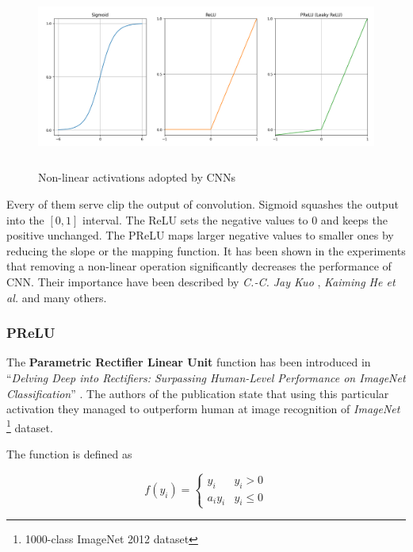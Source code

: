 \begin{figure}[h]
    \centering
    \includegraphics[width=16cm, height=6cm]{img/CNN-activations.png}
    \caption{Non-linear activations adopted by CNNs}
    \label{fig:conv-activation}
\end{figure}

Every of them serve clip the output of convolution. Sigmoid squashes the output into the $[0, 1]$ interval. The ReLU sets the negative values to 0 and keeps the positive unchanged. The PReLU maps larger negative values to smaller ones by reducing the slope or the mapping function. It has been shown in the experiments that removing a non-linear operation significantly decreases the performance of CNN. Their importance have been described by \emph{C.-C. Jay Kuo} \cite{kuo2016understanding}, \emph{Kaiming He et al.} \cite{he2015delving} and many others.


\subsubsection*{PReLU}
\label{sub2:prelu}

The \textbf{Parametric Rectifier Linear Unit} function has been introduced in ``\emph{Delving Deep into Rectifiers: Surpassing Human-Level Performance on ImageNet Classification}'' \cite{he2015delving}. The authors of the publication state that using this particular activation they managed to outperform human at image recognition of \emph{ImageNet} \footnote{1000-class ImageNet 2012 dataset} dataset.

The function is defined as

\begin{equation}
    f(y_i) = 
        \begin{cases}
        y_i & y_i > 0 \\
        a_i y_i & y_i \leq 0
        \end{cases}
\end{equation}

